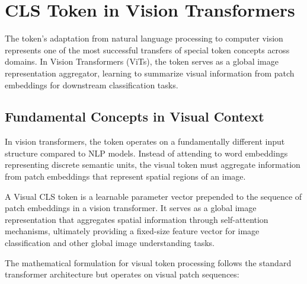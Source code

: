 
\section{CLS Token in Vision Transformers}

The \cls{} token's adaptation from natural language processing to computer vision represents one of the most successful transfers of special token concepts across domains. In Vision Transformers (ViTs), the \cls{} token serves as a global image representation aggregator, learning to summarize visual information from patch embeddings for downstream classification tasks.

\subsection{Fundamental Concepts in Visual Context}

In vision transformers, the \cls{} token operates on a fundamentally different input structure compared to NLP models. Instead of attending to word embeddings representing discrete semantic units, the visual \cls{} token must aggregate information from patch embeddings that represent spatial regions of an image.

\begin{definition}
A Visual CLS token is a learnable parameter vector prepended to the sequence of patch embeddings in a vision transformer. It serves as a global image representation that aggregates spatial information through self-attention mechanisms, ultimately providing a fixed-size feature vector for image classification and other global image understanding tasks.
\end{definition}

The mathematical formulation for visual \cls{} token processing follows the standard transformer architecture but operates on visual patch sequences:

